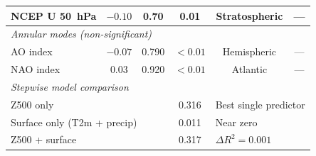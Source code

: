 \documentclass[11pt,letterpaper]{article}
\begin{document}
\begin{table}[!ht]
\begin{tabular}{lccccc}
NCEP U 50~hPa & $-0.10$ & 0.70 & 0.01 & Stratospheric & --- \\
\midrule
\multicolumn{6}{l}{\textit{Annular modes (non-significant)}} \\
AO index & $-0.07$ & 0.790 & $< 0.01$ & Hemispheric & --- \\
NAO index & 0.03 & 0.920 & $< 0.01$ & Atlantic & --- \\
\midrule
\multicolumn{6}{l}{\textit{Stepwise model comparison}} \\
\multicolumn{3}{l}{Z500 only} & 0.316 & \multicolumn{2}{l}{Best single predictor} \\
\multicolumn{3}{l}{Surface only (T2m + precip)} & 0.011 & \multicolumn{2}{l}{Near zero} \\
\multicolumn{3}{l}{Z500 + surface} & 0.317 & \multicolumn{2}{l}{$\Delta R^2 = 0.001$} \\
\bottomrule
\end{tabular}
\end{table}
\end{document}
